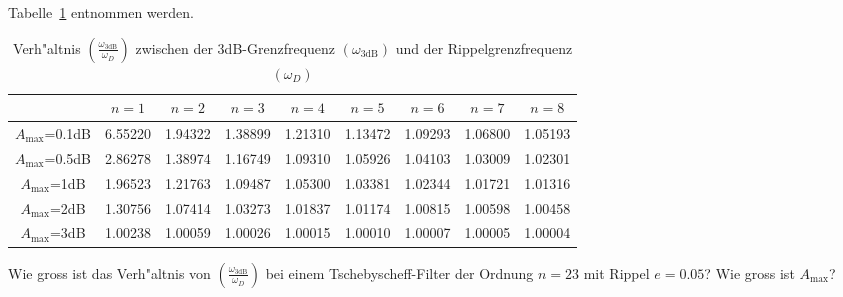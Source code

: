 Tabelle~\ref{3db-rippel} entnommen werden.
\begin{table}[!htb]
\begin{center}
{\footnotesize
\begin{tabular}{|c||c|c|c|c|c|c|c|c|}\hline
{} & $n=1$ & $n=2$ & $n=3$ &  $n=4$ &  $n=5$ & $n=6$ & $n=7$ & $n=8$ \\ \hline\hline
$A_{\max}$=0.1dB & 6.55220 & 1.94322 & 1.38899 & 1.21310 & 1.13472 & 1.09293 & 1.06800 & 1.05193 \\ \hline
$A_{\max}$=0.5dB & 2.86278 & 1.38974 & 1.16749 & 1.09310 & 1.05926 & 1.04103 & 1.03009 & 1.02301 \\ \hline
$A_{\max}$=1dB & 1.96523 & 1.21763 & 1.09487 & 1.05300 & 1.03381 & 1.02344 & 1.01721 & 1.01316 \\ \hline
$A_{\max}$=2dB & 1.30756 & 1.07414 & 1.03273 & 1.01837 & 1.01174 & 1.00815 & 1.00598 & 1.00458 \\ \hline
$A_{\max}$=3dB & 1.00238 & 1.00059 & 1.00026 & 1.00015 & 1.00010 & 1.00007 & 1.00005 & 1.00004 \\ \hline
\end{tabular}\vspace*{-3mm}\caption{Verh"altnis $\left(\frac{\omega_{\text{3dB}}}{\omega_D}\right)$ zwischen der 3dB-Grenzfrequenz $(\omega_{\text{3dB}})$ und der Rippelgrenzfrequenz $(\omega_D)$} \label{3db-rippel}
}
\end{center}
\vspace*{-6mm}
\end{table}


\aufg
Wie gross ist das Verh"altnis von $\left(\frac{\omega_{\text{3dB}}}{\omega_D}\right)$ bei einem Tschebyscheff-Filter der Ordnung $n=23$ mit Rippel $e=0.05$? Wie gross ist $A_{\max}$?\\


\clearpage

